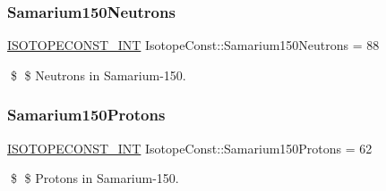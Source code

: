 \subsubsection{\texorpdfstring{Samarium150\+Neutrons}{Samarium150Neutrons}}
{\footnotesize\ttfamily \mbox{\hyperlink{group___isotope_const-_macros_ga5f18360b3e99483a35c32d789e62621c}{I\+S\+O\+T\+O\+P\+E\+C\+O\+N\+S\+T\+\_\+\+I\+NT}} Isotope\+Const\+::\+Samarium150\+Neutrons = 88}

\$ \$ Neutrons in Samarium-\/150. \mbox{\label{group___isotope_const-_samarium-_sm150_ga38f18778f2eb90c272d16d9ea8f40605}} 
\subsubsection{\texorpdfstring{Samarium150\+Protons}{Samarium150Protons}}
{\footnotesize\ttfamily \mbox{\hyperlink{group___isotope_const-_macros_ga5f18360b3e99483a35c32d789e62621c}{I\+S\+O\+T\+O\+P\+E\+C\+O\+N\+S\+T\+\_\+\+I\+NT}} Isotope\+Const\+::\+Samarium150\+Protons = 62}

\$ \$ Protons in Samarium-\/150. 